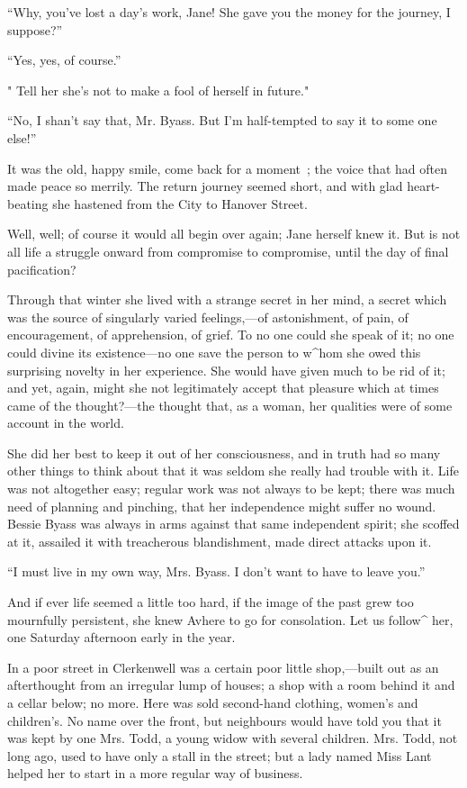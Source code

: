 ``Why, you've lost a day's work, Jane! She gave you the money for the
journey, I suppose?''

``Yes, yes, of course.''

" Tell her she's not to make a fool of herself in future."

``No, I shan't say that, Mr. Byass. But I'm half-tempted to say it to
some one else!''

It was the old, happy smile, come back for a moment~; the voice that had
often made peace so merrily. The return journey seemed short, and with
glad heart-beating she hastened from the City to Hanover Street.

Well, well; of course it would all begin over again; Jane herself knew
it. But is not all life a struggle onward from compromise to compromise,
until the day of final pacification?

Through that winter she lived with a strange secret in her mind, a
secret which was the source of singularly varied feelings,---of
astonishment, of pain, of encouragement, of apprehension, of grief. To
no one could she speak of it; no one could divine its existence---no one
save the person to w\^{}hom she owed this surprising novelty in her
experience. She would have {} given much to be rid of it; and yet,
again, might she not legitimately accept that pleasure which at times
came of the thought?---the thought that, as a woman, her qualities were
of some account in the world.

She did her best to keep it out of her consciousness, and in truth had
so many other things to think about that it was seldom she really had
trouble with it. Life was not altogether easy; regular work was not
always to be kept; there was much need of planning and pinching, that
her independence might suffer no wound. Bessie Byass was always in arms
against that same independent spirit; she scoffed at it, assailed it
with treacherous blandishment, made direct attacks upon it.

``I must live in my own way, Mrs. Byass. I don't want to have to leave
you.''

And if ever life seemed a little too hard, if the image of the past grew
too mournfully persistent, she knew Avhere to go for consolation. Let us
follow\^{} her, one Saturday afternoon early in the year.

In a poor street in Clerkenwell was a certain poor little shop,---built
out as an afterthought from an irregular lump of houses; a shop with {}
a room behind it and a cellar below; no more. Here was sold second-hand
clothing, women's and children's. No name over the front, but neighbours
would have told you that it was kept by one Mrs. Todd, a young widow
with several children. Mrs. Todd, not long ago, used to have only a
stall in the street; but a lady named Miss Lant helped her to start in a
more regular way of business.

